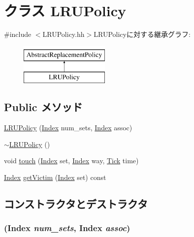 \hypertarget{classLRUPolicy}{
\section{クラス LRUPolicy}
\label{classLRUPolicy}
}


{\ttfamily \#include $<$LRUPolicy.hh$>$}LRUPolicyに対する継承グラフ:\begin{figure}[H]
\begin{center}
\leavevmode
\includegraphics[height=2cm]{classLRUPolicy}
\end{center}
\end{figure}
\subsection*{Public メソッド}
\begin{DoxyCompactItemize}
\item 
\hyperlink{classLRUPolicy_ae777c0de3ab5959d846dce3dee85339e}{LRUPolicy} (\hyperlink{TypeDefines_8hh_a39642de41f3574937f399f4fab25ba18}{Index} num\_\-sets, \hyperlink{TypeDefines_8hh_a39642de41f3574937f399f4fab25ba18}{Index} assoc)
\item 
\hyperlink{classLRUPolicy_aaa3d5ea7f1de71a3154582b87406249d}{$\sim$LRUPolicy} ()
\item 
void \hyperlink{classLRUPolicy_a6d3ff52feacdaba90c7c0bfbe9f7f58a}{touch} (\hyperlink{TypeDefines_8hh_a39642de41f3574937f399f4fab25ba18}{Index} set, \hyperlink{TypeDefines_8hh_a39642de41f3574937f399f4fab25ba18}{Index} way, \hyperlink{base_2types_8hh_a5c8ed81b7d238c9083e1037ba6d61643}{Tick} time)
\item 
\hyperlink{TypeDefines_8hh_a39642de41f3574937f399f4fab25ba18}{Index} \hyperlink{classLRUPolicy_aad2c302009bdae8c2f86d7c4e0ed2c8f}{getVictim} (\hyperlink{TypeDefines_8hh_a39642de41f3574937f399f4fab25ba18}{Index} set) const 
\end{DoxyCompactItemize}


\subsection{コンストラクタとデストラクタ}
\hypertarget{classLRUPolicy_ae777c0de3ab5959d846dce3dee85339e}{
\subsubsection[{LRUPolicy}]{ ({\bf Index} {\em num\_\-sets}, \/  {\bf Index} {\em assoc})}}
\label{classLRUPolicy_ae777c0de3ab5959d846dce3dee85339e}



